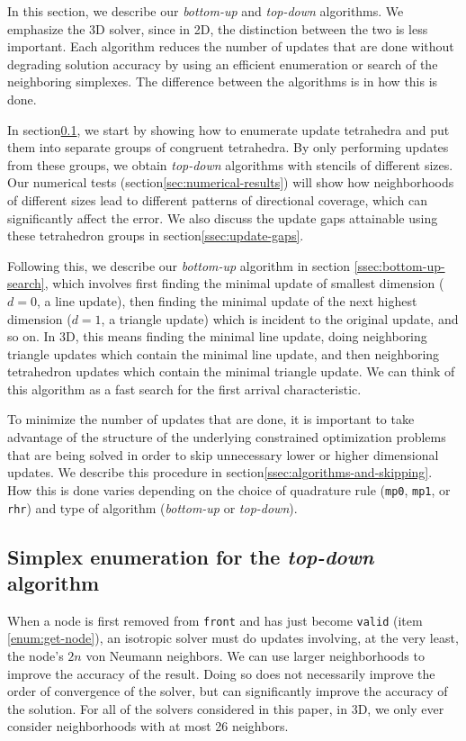 \documentclass[smallcondensed]{svjour3}
\begin{document}
In this section, we describe our \emph{bottom-up} and \emph{top-down}
algorithms. We emphasize the 3D solver, since in 2D, the distinction
between the two is less important. Each algorithm reduces the number
of updates that are done without degrading solution accuracy by using
an efficient enumeration or search of the neighboring simplexes. The
difference between the algorithms is in how this is done.

In section\@ \ref{ssec:simplex-enumeration}, we start by showing how
to enumerate update tetrahedra and put them into separate groups of
congruent tetrahedra. By only performing updates from these groups, we
obtain \emph{top-down} algorithms with stencils of different sizes. Our
numerical tests (section\@ \ref{sec:numerical-results}) will show how
neighborhoods of different sizes lead to different patterns of
directional coverage, which can significantly affect the error. We
also discuss the update gaps attainable using these tetrahedron groups
in section\@ \ref{ssec:update-gaps}.

Following this, we describe our \emph{bottom-up} algorithm in section\@
\ref{ssec:bottom-up-search}, which involves first finding the minimal
update of smallest dimension ($d = 0$, a line update), then finding
the minimal update of the next highest dimension ($d = 1$, a triangle
update) which is incident to the original update, and so on. In 3D,
this means finding the minimal line update, doing neighboring triangle
updates which contain the minimal line update, and then neighboring
tetrahedron updates which contain the minimal triangle update. We can
think of this algorithm as a fast search for the first arrival
characteristic.

To minimize the number of updates that are done, it is important to
take advantage of the structure of the underlying constrained
optimization problems that are being solved in order to skip
unnecessary lower or higher dimensional updates. We describe this
procedure in section\@ \ref{ssec:algorithms-and-skipping}. How this
is done varies depending on the choice of quadrature rule
(\texttt{mp0}, \texttt{mp1}, or \texttt{rhr}) and type of algorithm
(\emph{bottom-up} or \emph{top-down}).

\subsection{Simplex enumeration for the \emph{top-down}
  algorithm}\label{ssec:simplex-enumeration}

When a node is first removed from \texttt{front} and has just become
\texttt{valid} (item \ref{enum:get-node}), an isotropic solver must do
updates involving, at the very least, the node's $2n$ von Neumann
neighbors. We can use larger neighborhoods to improve the accuracy of
the result. Doing so does not necessarily improve the order of
convergence of the solver, but can significantly improve the accuracy
of the solution. For all of the solvers considered in this paper, in
3D, we only ever consider neighborhoods with at most 26 neighbors.
\end{document}
